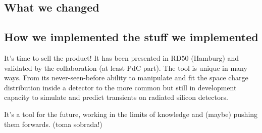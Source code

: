 \subsection{What we changed}

\subsection{How we implemented the stuff we implemented}

It's time to sell the product! It has been presented in RD50 (Hamburg) and validated by the collaboration (at least PdC part). The tool is unique in many ways. From its never-seen-before ability to manipulate and fit the space charge distribution inside a detector to the more common but still in development capacity to simulate and predict transients on radiated silicon detectors.

It's a tool for the future, working in the limits of knowledge and (maybe) pushing them forwards. (toma sobrada!)

